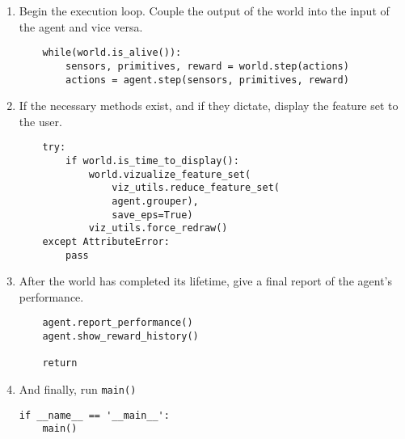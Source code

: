 \begin{enumerate}
\item
Begin the execution loop. Couple the output of the world into the input of the agent and vice versa.
\begin{verbatim}    
    while(world.is_alive()):
        sensors, primitives, reward = world.step(actions)
        actions = agent.step(sensors, primitives, reward)
\end{verbatim}

\item
If the necessary methods exist, and if they dictate, display the feature set to the user.        
\begin{verbatim}    
    try:
        if world.is_time_to_display():
            world.vizualize_feature_set(
                viz_utils.reduce_feature_set(
                agent.grouper), 
                save_eps=True)
            viz_utils.force_redraw()
    except AttributeError:
        pass
\end{verbatim}

\item
After the world has completed its lifetime, give a final report of the agent's performance.    
\begin{verbatim}    
    agent.report_performance()
    agent.show_reward_history()
    
    return
\end{verbatim}

\item
And finally, run \texttt{main()}    
\begin{verbatim}    
if __name__ == '__main__':
    main()
\end{verbatim}

\end{enumerate}


